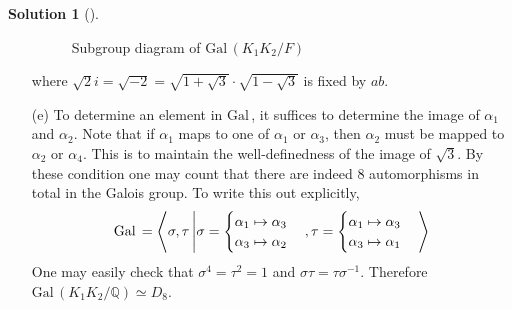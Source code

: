 \documentclass{article}
\theoremstyle{definition}
\newtheorem*{sol}{Solution}
\newenvironment{sols}[1][]{%
  \begin{sol}[#1]$ $\par\nobreak\ignorespaces
}{%
  \end{sol}
}
\newcommand{\QQ}{\mathbb Q}
\newcommand{\Gal}{\text{Gal}\,}
\newcommand{\id}{\text{id}}
\begin{document}
\begin{sols}
\begin{enumerate}
			\begin{figure}[H]
				\centering
				\caption{Subgroup diagram of $\Gal(K_1 K_2/F)$}
			\end{figure}

			where $\sqrt{2}i = \sqrt{-2} = \sqrt{1 + \sqrt{3}} \cdot \sqrt{1 - \sqrt{3}}$ is fixed by $ab$.

		\item[(e)] To determine an element in $\Gal$, it suffices to determine the image of $\alpha_1$ and $\alpha_2$.
			Note that if $\alpha_1$ maps to one of $\alpha_1$ or $\alpha_3$, then $\alpha_2$ must be mapped to $\alpha_2$ or $\alpha_4$.
			This is to maintain the well-definedness of the image of $\sqrt{3}$.
			By these condition one may count that there are indeed 8 automorphisms in total in the Galois group.
			To write this out explicitly, 
			\[
				\Gal = \ev{\sigma, \tau\left| \sigma = 
				\begin{cases}
					\alpha_1 \mapsto \alpha_3\\
					\alpha_3 \mapsto \alpha_2
				\end{cases}, \tau =
				\begin{cases}
					\alpha_1 \mapsto \alpha_3\\
					\alpha_3 \mapsto \alpha_1
				\end{cases}
				\right.}
			\]
			One may easily check that $\sigma^4 = \tau^2 = 1$ and $\sigma \tau = \tau \sigma^{-1}$.
			Therefore $\Gal(K_1 K_2/\QQ) \simeq D_8$.

	\end{enumerate}
\end{sols}
\end{document}
